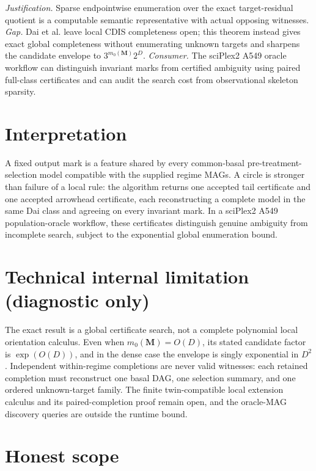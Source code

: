 \documentclass{article}
\begin{document}
\par\smallskip\noindent \textit{Justification.} Sparse endpointwise enumeration over the exact target-residual quotient is a computable semantic representative with actual opposing witnesses. \textit{Gap.} Dai et al. leave local CDIS completeness open; this theorem instead gives exact global completeness without enumerating unknown targets and sharpens the candidate envelope to \(3^{m_0(\mathbf M)}2^D\). \textit{Consumer.} The sciPlex2 A549 oracle workflow can distinguish invariant marks from certified ambiguity using paired full-class certificates and can audit the search cost from observational skeleton sparsity.

\section{Interpretation}

A fixed output mark is a feature shared by every common-basal pre-treatment-selection model compatible with the supplied regime MAGs.  A circle is stronger than failure of a local rule: the algorithm returns one accepted tail certificate and one accepted arrowhead certificate, each reconstructing a complete model in the same Dai class and agreeing on every invariant mark.  In a sciPlex2 A549 population-oracle workflow, these certificates distinguish genuine ambiguity from incomplete search, subject to the exponential global enumeration bound.

\section*{Technical internal limitation (diagnostic only)}

The exact result is a global certificate search, not a complete polynomial local orientation calculus.  Even when \(m_0(\mathbf M)=O(D)\), its stated candidate factor is \(\exp(O(D))\), and in the dense case the envelope is singly exponential in \(D^2\).  Independent within-regime completions are never valid witnesses: each retained completion must reconstruct one basal DAG, one selection summary, and one ordered unknown-target family.  The finite twin-compatible local extension calculus and its paired-completion proof remain open, and the oracle-MAG discovery queries are outside the runtime bound.

\section{Honest scope}
\end{document}
